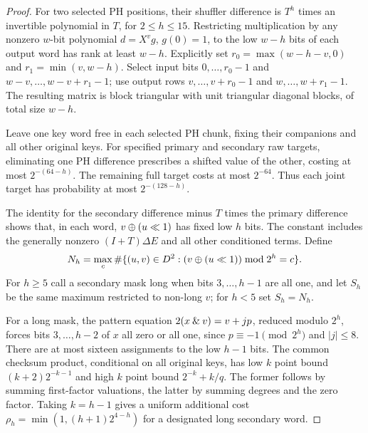 \begin{proof}
For two selected PH positions, their shuffler difference is $T^h$ times an invertible polynomial in $T$, for $2\le h\le15$. Restricting multiplication by any nonzero $w$-bit polynomial $d=X^v g$, $g(0)=1$, to the low $w-h$ bits of each output word has rank at least $w-h$. Explicitly set $r_0=\max(w-h-v,0)$ and $r_1=\min(v,w-h)$. Select input bits $0,\ldots,r_0-1$ and $w-v,\ldots,w-v+r_1-1$; use output rows $v,\ldots,v+r_0-1$ and $w,\ldots,w+r_1-1$. The resulting matrix is block triangular with unit triangular diagonal blocks, of total size $w-h$.

Leave one key word free in each selected PH chunk, fixing their companions and all other original keys. For specified primary and secondary raw targets, eliminating one PH difference prescribes a shifted value of the other, costing at most $2^{-(64-h)}$. The remaining full target costs at most $2^{-64}$. Thus each joint target has probability at most $2^{-(128-h)}$.

The identity for the secondary difference minus $T$ times the primary difference shows that, in each word, $v\mathbin\oplus(u\ll1)$ has fixed low $h$ bits. The constant includes the generally nonzero $(I+T)\Delta E$ and all other conditioned terms. Define
\[
 N_h=\max_c\#\{(u,v)\in D^2:(v\mathbin\oplus(u\ll1))\bmod2^h=c\}.
\]
For $h\ge5$ call a secondary mask long when bits $3,\ldots,h-1$ are all one, and let $S_h$ be the same maximum restricted to non-long $v$; for $h<5$ set $S_h=N_h$.

For a long mask, the pattern equation $2(x\mathbin{\&} v)=v+jp$, reduced modulo $2^h$, forces bits $3,\ldots,h-2$ of $x$ all zero or all one, since $p\equiv-1\pmod{2^h}$ and $|j|\le8$. There are at most sixteen assignments to the low $h-1$ bits. The common checksum product, conditional on all original keys, has low $k$ point bound $(k+2)2^{-k-1}$ and high $k$ point bound $2^{-k}+k/q$. The former follows by summing first-factor valuations, the latter by summing degrees and the zero factor. Taking $k=h-1$ gives a uniform additional cost
$\rho_h=\min(1,(h+1)2^{4-h})$ for a designated long secondary word.


\end{proof}
